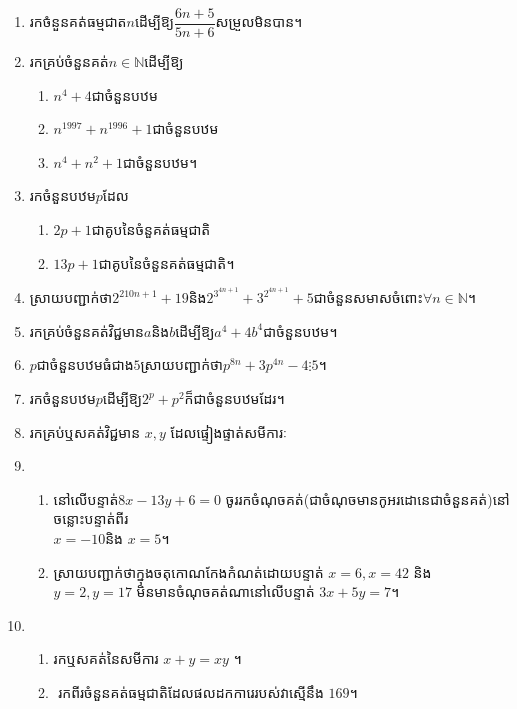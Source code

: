 \documentclass[a4paper,12pt]{book}
\newcommand{\N}{\mathbb{N}}
\begin{document}
\begin{enumerate}[1]
\item រកចំនួនគត់ធម្មជាត$n$ដើម្បី​ឱ្យ$\dfrac{6n+5}{5n+6}$សម្រួលមិនបាន។
\item រកគ្រប់ចំនួនគត់$n\in {\N}$ដើម្បីឱ្យ
\begin{enumerate}[a]
\item $n^{4}+4$ជាចំនួនបឋម
\item $n^{1997}+n^{1996}+1$ជាចំនួនបឋម
\item $n^{4}+n^{2}+1$ជាចំនួនបឋម។
\end{enumerate}
\item រកចំនួនបឋម$p$ដែល
\begin{enumerate}[a]
\item $2p+1$ជាគូបនៃចំនួគត់ធម្មជាតិ
\item $13p+1$ជាគូបនៃចំនួនគត់ធម្មជាតិ។
\end{enumerate}
\item ស្រាយបញ្ជាក់ថា$2^{2{10n+1}}+19$និង$2^{3^{4n+1}}+3^{2^{4n+1}}+5$ជាចំនួនសមាសចំពោះ$\forall n \in {\N}$។
\item រកគ្រប់ចំនួនគត់វិជ្ជមាន$a$និង$b$ដើម្បីឱ្យ$a^{4}+4b^{4}$ជាចំនួនបឋម។
\item $p$ជាចំនួនបឋមធំជាង$5$ស្រាយបញ្ជាក់ថា$p^{8n}+3p^{4n}-4 \vdots 5$។
\item រកចំនួនបឋម$p$ដើម្បីឱ្យ$2^{p}+p^{2}$ក៏ជាចំនួនបឋមដែរ។
\item រកគ្រប់ឬសគត់វិជ្ជមាន $x,y$ ដែលផ្ទៀងផ្ទាត់សមីការៈ
\begin{enumerate}[a]
\end{enumerate}
\item 
\begin{enumerate}[a]
\item នៅលើបន្ទាត់​ $8x-13y+6=0$ ចូររកចំណុចគត់(ជាចំណុចមានកូអរដោនេជាចំនួនគត់)នៅចន្លោះបន្ទាត់ពីរ\\ $x=-10$​ និង $x=5$។
\item ស្រាយបញ្ជាក់ថាក្នុងចតុកោណកែងកំណត់ដោយបន្ទាត់ $x=6, x=42$ និង $y=2, y=17$ មិនមានចំណុចគត់ណានៅលើបន្ទាត់ $3x+5y=7$។
\end{enumerate}
\item 
\begin{enumerate}[a]
\item រកឬសគត់នៃសមីការ $x+y=xy$ ។
\item​ រកពីរចំនួនគត់ធម្មជាតិដែលផលដកការេរបស់វាស្មើនឹង $169$។

\end{enumerate}
\end{enumerate}
\end{document}
